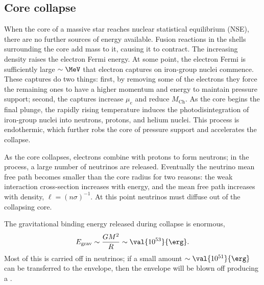 \subsection{Core collapse}
When the core of a massive star reaches nuclear statistical equilibrium (NSE), there are no further sources of energy available. Fusion reactions in the shells surrounding the core add mass to it, causing it to contract.  The increasing density raises the electron Fermi energy.  At some point, the electron Fermi is sufficiently large $\sim\MeV$ that electron captures on iron-group nuclei commence.  These captures do two things: first, by removing some of the electrons they force the remaining ones to have a higher momentum and energy to maintain pressure support; second, the captures increase $\mu_{e}$ and reduce $M_{\mathrm{Ch}}$.  As the core begins the final plunge, the rapidly rising temperature induces the photodisintegration of iron-group nuclei into neutrons, protons, and helium nuclei.  This process is endothermic, which further robs the core of pressure support and accelerates the collapse.

As the core collapses, electrons combine with protons to form neutrons; in the process, a large number of neutrinos are released.  Eventually the neutrino mean free path becomes smaller than the core radius for two reasons: the weak interaction cross-section increases with energy, and the mean free path increases with density, $\ell = (n\sigma)^{-1}$.  At this point neutrinos must diffuse out of the collapsing core.

The gravitational binding energy released during collapse is enormous,
\[ E_{\mathrm{grav}} \sim \frac{GM^{2}}{R} \sim \val{10^{53}}{\erg}. \]
Most of this is carried off in neutrinos; if a small amount $\sim \val{10^{51}}{\erg}$ can be transferred to the envelope, then the envelope will be blown off producing a .

